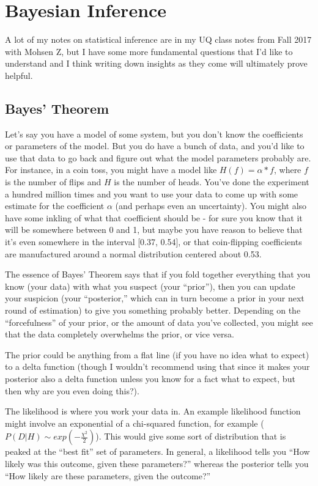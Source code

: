 \chapter{Bayesian Inference}

A lot of my notes on statistical inference are in my UQ class notes from Fall 2017 with Mohsen Z, but I have some more fundamental questions that I'd like to understand and I think writing down insights as they come will ultimately prove helpful.

\section{Bayes' Theorem}

Let's say you have a model of some system, but you don't know the coefficients or parameters of the model. But you do have a bunch of data, and you'd like to use that data to go back and figure out what the model parameters probably are. For instance, in a coin toss, you might have a model like $H(f) = \alpha*f$, where $f$ is the number of flips and $H$ is the number of heads. You've done the experiment a hundred million times and you want to use your data to come up with some estimate for the coefficient $\alpha$ (and perhaps even an uncertainty). You might also have some inkling of what that coefficient should be - for sure you know that it will be somewhere between 0 and 1, but maybe you have reason to believe that it's even somewhere in the interval [0.37, 0.54], or that coin-flipping coefficients are manufactured around a normal distribution centered about 0.53.

The essence of Bayes' Theorem says that if you fold together everything that you know (your data) with what you suspect (your ``prior''), then you can update your suspicion (your ``posterior,'' which can in turn become a prior in your next round of estimation) to give you something probably better. Depending on the ``forcefulness'' of your prior, or the amount of data you've collected, you might see that the data completely overwhelms the prior, or vice versa.

The prior could be anything from a flat line (if you have no idea what to expect) to a delta function (though I wouldn't recommend using that since it makes your posterior also a delta function unless you know for a fact what to expect, but then why are you even doing this?).

The likelihood is where you work your data in. An example likelihood function might involve an exponential of a chi-squared function, for example ($P(D|H) \sim exp(-\frac{\chi^2}{2})$). This would give some sort of distribution that is peaked at the ``best fit'' set of parameters. In general, a likelihood tells you ``How likely was this outcome, given these parameters?'' whereas the posterior tells you ``How likely are these parameters, given the outcome?''

